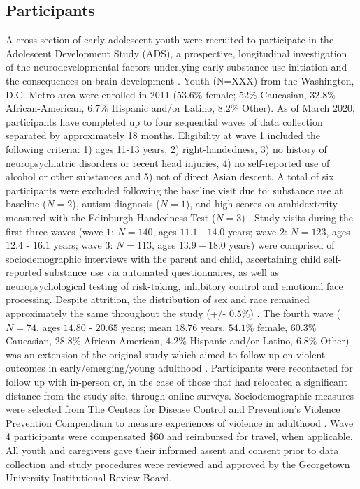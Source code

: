 \documentclass[utf8]{frontiersSCNS} %
\begin{document}
\subsection{Participants} A cross-section of early adolescent youth were recruited to participate in the Adolescent Development Study (ADS), a prospective, longitudinal investigation of the neurodevelopmental factors underlying early substance use initiation and the consequences on brain development \citep{Fishbein2016}. Youth (N=XXX) from the Washington, D.C. Metro area were enrolled in 2011 ($53.6\%$ female; $52\%$ Caucasian, $32.8\%$ African-American, $6.7\%$ Hispanic and/or Latino, $8.2\%$ Other). As of March 2020, participants have completed up to four sequential waves of data collection separated by approximately 18 months. Eligibility at wave 1 included the following criteria: 1) ages 11-13 years, 2) right-handedness, 3) no history of neuropsychiatric disorders or recent head injuries, 4) no self-reported use of alcohol or other substances and 5) not of direct Asian descent. A total of six participants were excluded following the baseline visit due to: substance use at baseline ($N=2$), autism diagnosis ($N=1$), and high scores on ambidexterity measured with the Edinburgh Handedness Test ($N=3$) \citep{veale2014edinburgh}. Study visits during the first three waves (wave $1$: $N=140$, ages $11.1$ - $14.0$ years; wave $2$:  $N=123$, ages $12.4$ - $16.1$ years; wave $3$: $N=113$, ages $13.9 - 18.0$ years) were comprised of sociodemographic interviews with the parent and child, ascertaining child self-reported substance use via automated questionnaires, as well as neuropsychological testing of risk-taking, inhibitory control and emotional face processing. Despite attrition, the distribution of sex and race remained approximately the same throughout the study (+/- $0.5\%$) . The fourth wave ($N=74$, ages $14.80$ - $20.65$ years; mean $18.76$ years, $54.1\%$ female, $60.3\%$ Caucasian, $28.8\%$ African-American, $4.2\%$ Hispanic and/or Latino, $6.8\%$ Other) was an extension of the original study which aimed to follow up on violent outcomes in early/emerging/young adulthood \citep{ElDamaty2016NIJ}. Participants were recontacted for follow up with in-person or, in the case of those that had relocated a significant distance from the study site, through online surveys. Sociodemographic measures were selected from The Centers for Disease Control and Prevention’s Violence Prevention Compendium to measure experiences of violence in adulthood \citep{dahlberg2005measuring}. Wave 4 participants were compensated \$$60$ and reimbursed for travel, when applicable. All youth and caregivers gave their informed assent and consent prior to data collection and study procedures were reviewed and approved by the Georgetown University Institutional Review Board.
\end{document}
